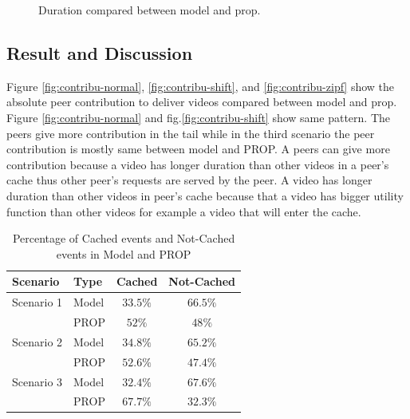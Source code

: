 \documentclass[10pt,final,journal,a4paper]{IEEEtran}
\begin{document}
\begin{figure}[!t]
\centering
{}
\hfill
{}
\hfill
{}
\vspace{2mm}
\caption{Duration compared between model and prop.}
\label{fig:duration}
\end{figure}



\subsection{Result and Discussion}\label{resultanddiscussion}
Figure \ref{fig:contribu-normal}, \ref{fig:contribu-shift}, and \ref{fig:contribu-zipf} show the absolute peer contribution to deliver videos compared between model and prop. 
Figure \ref{fig:contribu-normal} and fig.\ref{fig:contribu-shift} show same pattern.
The peers give more contribution in the tail while in the third scenario the peer contribution is mostly same between model and PROP. 
A peers can give more contribution because a video has longer duration than other videos in a peer's cache thus other peer's requests are served by the peer. 
A video has longer duration than other videos in peer's cache because that a video has bigger utility function than other videos for example a video that will enter the cache. 

\begin{table}[!t]
\caption{Percentage of Cached events and Not-Cached events in Model and PROP}
\label{tab:stacked1}
\centering
\begin{tabular}{|l|l|c|c|}
\hline
Scenario & Type & Cached & Not-Cached\\
\hline
Scenario 1 & Model & $33.5\%$ & $66.5\%$ \\
\hline
 & PROP & $52\%$ & $48\%$  \\
\hline

Scenario 2 & Model & $34.8\%$ & $65.2\%$ \\
\hline
 & PROP & $52.6\%$ & $47.4\%$  \\
\hline

Scenario 3 & Model & $32.4\%$ & $67.6\%$  \\
\hline
 & PROP & $67.7\%$ & $32.3\%$ \\
\hline
\end{tabular}
\end{table}
\end{document}

